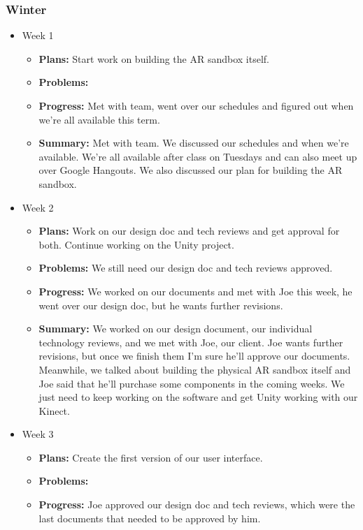 \documentclass[onecolumn, draftclsnofoot,10pt, compsoc]{IEEEtran}
\begin{document}
\subsubsection{Winter}
\begin{itemize}
\item Week 1
	\begin{itemize}
	\item \textbf{Plans:} Start work on building the AR sandbox itself.
    \item \textbf{Problems:} 
    \item \textbf{Progress:} Met with team, went over our schedules and figured out when we're all available this term.
    \item \textbf{Summary:} Met with team. We discussed our schedules and when we're available. We're all available after class on Tuesdays and can also meet up over Google Hangouts. We also discussed our plan for building the AR sandbox.
	\end{itemize}
\item Week 2
	\begin{itemize}
	\item \textbf{Plans:} Work on our design doc and tech reviews and get approval for both. Continue working on the Unity project.
    \item \textbf{Problems:} We still need our design doc and tech reviews approved.
    \item \textbf{Progress:} We worked on our documents and met with Joe this week, he went over our design doc, but he wants further revisions.
    \item \textbf{Summary:} We worked on our design document, our individual technology reviews, and we met with Joe, our client. Joe wants further revisions, but once we finish them I'm sure he'll approve our documents. Meanwhile, we talked about building the physical AR sandbox itself and Joe said that he'll purchase some components in the coming weeks. We just need to keep working on the software and get Unity working with our Kinect.
	\end{itemize}
\item Week 3
	\begin{itemize}
	\item \textbf{Plans:} Create the first version of our user interface.
    \item \textbf{Problems:} 
    \item \textbf{Progress:} Joe approved our design doc and tech reviews, which were the last documents that needed to be approved by him.

\end{itemize}
\end{itemize}
\end{document}
